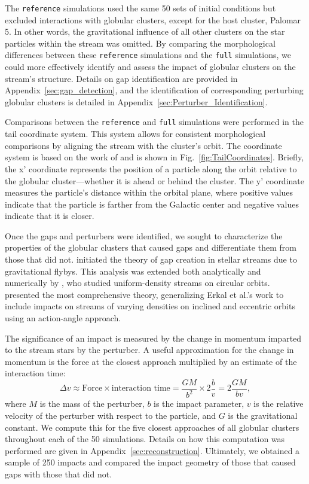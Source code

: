 \documentclass{aa}
\begin{document}
    The \texttt{reference} simulations used the same 50 sets of initial conditions but excluded interactions with globular clusters, except for the host cluster, Palomar 5. In other words, the gravitational influence of all other clusters on the star particles within the stream was omitted. By comparing the morphological differences between these \texttt{reference} simulations and the \texttt{full} simulations, we could more effectively identify and assess the impact of globular clusters on the stream's structure. Details on gap identification are provided in Appendix~\ref{sec:gap_detection}, and the identification of corresponding perturbing globular clusters is detailed in Appendix~\ref{sec:Perturber_Identification}.


    Comparisons between the \texttt{reference} and \texttt{full} simulations were performed in the tail coordinate system. This system allows for consistent morphological comparisons by aligning the stream with the cluster's orbit. The coordinate system is based on the work of \citet{2004AJ....127.2753D} and is shown in Fig.~\ref{fig:TailCoordinates}. Briefly, the x' coordinate represents the position of a particle along the orbit relative to the globular cluster—whether it is ahead or behind the cluster. The y' coordinate measures the particle's distance within the orbital plane, where positive values indicate that the particle is farther from the Galactic center and negative values indicate that it is closer.

    
    Once the gaps and perturbers were identified, we sought to characterize the properties of the globular clusters that caused gaps and differentiate them from those that did not. \citet{2013ApJ...775...90C} initiated the theory of gap creation in stellar streams due to gravitational flybys. This analysis was extended both analytically and numerically by \citet{2015MNRAS.450.1136E}, who studied uniform-density streams on circular orbits. \citet{2016MNRAS.457.3817S} presented the most comprehensive theory, generalizing Erkal et al.'s work to include impacts on streams of varying densities on inclined and eccentric orbits using an action-angle approach.

    The significance of an impact is measured by the change in momentum imparted to the stream stars by the perturber. A useful approximation for the change in momentum is the force at the closest approach multiplied by an estimate of the interaction time: \begin{equation} \label{eq:change_in_momentum} \Delta v \approx \text{Force} \times \text{interaction time} = \frac{GM}{b^2} \times 2\frac{b}{v} = 2\frac{GM}{bv}, \end{equation} where $M$ is the mass of the perturber, $b$ is the impact parameter, $v$ is the relative velocity of the perturber with respect to the particle, and $G$ is the gravitational constant. We compute this for the five closest approaches of all globular clusters throughout each of the 50 simulations. Details on how this computation was performed are given in Appendix~\ref{sec:reconstruction}. Ultimately, we obtained a sample of 250 impacts and compared the impact geometry of those that caused gaps with those that did not.
    
\end{document}
